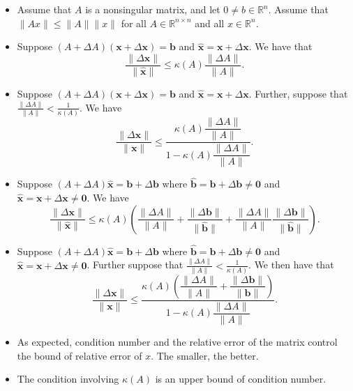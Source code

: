 \documentclass[11pt,reqno]{amsart}
\theoremstyle{remark}
\begin{document}
\begin{itemize}
\item Assume that $A$ is a nonsingular matrix, and let $0\neq b\in \mathbb{R}^n$.
Assume that $\lVert Ax\rVert\leq\lVert A\rVert\lVert x\rVert$ for all $A\in \mathbb{R}^{n\times n}$ and all $x\in \mathbb{R}^n$.
\item Suppose $(A+\Delta A)(\mathbf{x}+\Delta\mathbf{x})=\mathbf{b}$ and
$\mathbf{\hat{x}}=\mathbf{x}+\Delta\mathbf{x}$. We have that
\begin{equation}
\frac{\lVert\Delta\mathbf{x}\rVert}{\lVert\mathbf{\hat{x}}\rVert}\le
\kappa(A)\dfrac{\lVert\Delta A\rVert}{\lVert A\rVert}. \label{eq:perturb2}
\end{equation}
\item Suppose $(A+\Delta A)(\mathbf{x}+\Delta\mathbf{x})=\mathbf{b}$ and
$\mathbf{\hat{x}}=\mathbf{x}+\Delta\mathbf{x}$. Further, suppose that $\frac{\lVert\Delta A\rVert}
{\rVert A\rVert}<\frac 1{\kappa(A)}$.
We have
\begin{equation}
\frac{\lVert\Delta\mathbf{x}\rVert}{\lVert\mathbf{x}\rVert}\le\frac
{\kappa(A)\dfrac{\lVert\Delta A\rVert}{\lVert A\rVert}}{1-\kappa
(A)\dfrac{\lVert\Delta A\rVert}{\lVert A\rVert}}.
\end{equation}
\item Suppose $(A+\Delta A)\mathbf{\hat{x}}=\mathbf{b}
+\Delta\mathbf{b}$ where $\mathbf{\hat{b}}=\mathbf{b}+\Delta\mathbf{b}
\neq\mathbf{0}$ and $\mathbf{\hat{x}}=\mathbf{x}+\Delta\mathbf{x}
\neq\mathbf{0}$. We have
\begin{equation}
\frac{\lVert\Delta\mathbf{x}\rVert}{\lVert\mathbf{\hat{x}}\rVert}\le
\kappa(A)\left(  \frac{\lVert\Delta A\rVert}{\lVert A\rVert}+\frac
{\lVert\Delta\mathbf{b}\rVert}{\lVert\mathbf{\hat{b}}\rVert}+\frac
{\lVert\Delta A\rVert}{\lVert A\rVert}\frac{\lVert\Delta\mathbf{b}\rVert
}{\lVert\mathbf{\hat{b}}\rVert}\right)  . \label{eq:perturb3}
\end{equation}
\item Suppose $(A+\Delta A)\mathbf{\hat{x}}=\mathbf{b}
+\Delta\mathbf{b}$ where $\mathbf{\hat{b}}=\mathbf{b}+\Delta\mathbf{b}
\neq\mathbf{0}$ and $\mathbf{\hat{x}}=\mathbf{x}+\Delta\mathbf{x}
\neq\mathbf{0}$. Further suppose that $\frac{\lVert\Delta A\rVert}{\rVert A\rVert}<\frac 1{\kappa(A)}$.
We then have that
\begin{equation}
\frac{\lVert\Delta\mathbf{x}\rVert}{\lVert\mathbf{x}\rVert}\le\frac
{\kappa(A)\left(  \dfrac{\lVert\Delta A\rVert}{\lVert A\rVert}+\dfrac
{\lVert\Delta\mathbf{b}\rVert}{\lVert\mathbf{b}\rVert}\right)  }
{1-\kappa(A)\dfrac{\lVert\Delta A\rVert}{\lVert A\rVert}}.
\end{equation}
\item As expected, condition number and the relative error of the matrix control the bound of relative error of $x$. The smaller, the better. 
\item The condition involving $\kappa(A)$ is an upper bound of condition number. 
\end{itemize}
\end{document}
